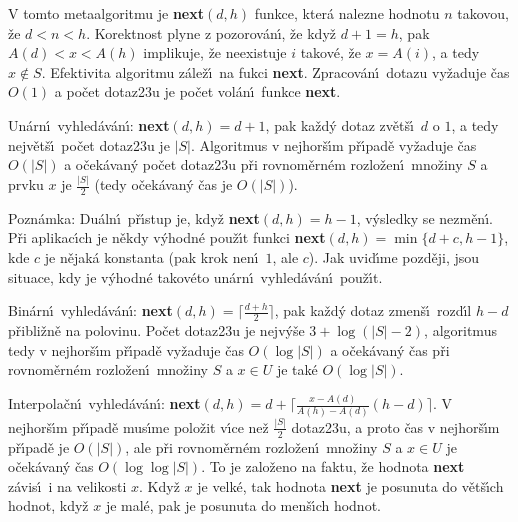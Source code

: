 \flushpar V tomto metaalgoritmu je {\bf next$(d,h)$} funkce, kter\'a 
nalezne hodnotu $n$ takovou, \v ze $d<n<h$. Korektnost plyne 
z pozorov\'an\'\i , \v ze kdy\v z $d+1=h$, pak $A(d)<x<A(h)$ 
implikuje, \v ze neexistuje $i$ takov\'e, \v ze $x=A(i)$, a tedy 
$x\notin S$. Efektivita algoritmu z\'ale\v z\'\i\ na fukci {\bf next}. 
Zpracov\'an\'\i\ dotazu vy\v zaduje \v cas $O(1)$ a po\v cet 
dotaz\accent23u je 
po\v cet vol\'an\'\i\ funkce {\bf next}. 
\medskip

\flushpar Un\'arn\'\i\ vyhled\'av\'an\'\i : {\bf next$(d,h)=d+1$}, pak ka\v zd\'y 
dotaz zv\v et\v s\'\i\ $d$ o $1$, a tedy nejv\v et\v s\'\i\ po\v cet 
dotaz\accent23u je $|S|$. Algoritmus v nej\-hor\v s\'\i m p\v r\'\i pad\v e 
vy\v zaduje \v cas $O(|S|)$ a o\v cek\'avan\'y po\v cet dotaz\accent23u p\v ri 
rovnom\v ern\'em rozlo\v zen\'\i\ mno\v ziny $S$ a prvku $x$ je $\frac {
|S|}2$ 
(tedy o\v cek\'avan\'y \v cas je $O(|S|)$). 
\medskip

\flushpar Pozn\'amka: Du\'aln\'\i\ p\v r\'\i stup je, kdy\v z 
{\bf next$(d,h)=h-1$}, v\'ysled\-ky se nezm\v en\'\i . P\v ri aplikac\'\i ch je 
n\v ekdy v\'yhodn\'e pou\v z\'\i t funkci {\bf next$(d,h)=\min\{d
+c,h-1\}$}, 
kde $c$ je n\v ejak\'a konstanta (pak krok nen\'\i\ $1$, ale $c$). Jak 
uvid\'\i me pozd\v eji, jsou situace, kdy je v\'yhodn\'e  
takov\'eto un\'arn\'\i\ vyhled\'av\'an\'\i\ pou\v z\'\i t.
\medskip

\flushpar Bin\'arn\'\i\ vyhled\'av\'an\'\i : {\bf next$(d,h)=\lceil\frac {
d+h}2\rceil$}, pak 
ka\v zd\'y dotaz zmen\v s\'\i\ rozd\'\i l $h-d$ p\v ribli\v zn\v e na polovinu. 
Po\v cet dotaz\accent23u je nejv\'y\v se $3+\log(|S|-2)$, 
algoritmus tedy v 
nejhor\v s\'\i m p\v r\'\i pad\v e vy\v zaduje \v cas $O(\log|S|)$ a  
o\v cek\'avan\'y \v cas p\v ri rovnom\v ern\'em roz\-lo\v zen\'\i\ mno\v ziny $
S$ a 
$x\in U$ je tak\'e $O(\log|S|)$.
\medskip

\flushpar Interpola\v cn\'\i\ vyhled\'av\'an\'\i : 
{\bf next$(d,h)=d+\lceil\frac {x-A(d)}{A(h)-A(d)}(h-d)\rceil$}. V nejhor\v s\'\i m p\v r\'\i pad\v e 
mus\'\i me polo\v zit v\'\i ce ne\v z $\frac {|S|}2$ dotaz\accent23u, a proto \v cas 
v nejhor\v s\'\i m p\v r\'\i pad\v e je $O(|S|)$, ale p\v ri rovnom\v ern\'em 
roz\-lo\v zen\'\i\ mno\v ziny $S$ a $x\in U$ je o\v cek\'avan\'y \v cas 
$O(\log\log|S|)$. To je zalo\v zeno na faktu, \v ze hodnota {\bf next }
z\'avis\'\i\ i na velikosti $x$. Kdy\v z $x$ je velk\'e, tak hodnota 
{\bf next} je posunuta do v\v et\v s\'\i ch hodnot, kdy\v z $x$ je mal\'e, 
pak je posunuta do men\v s\'\i ch hodnot.
\medskip


